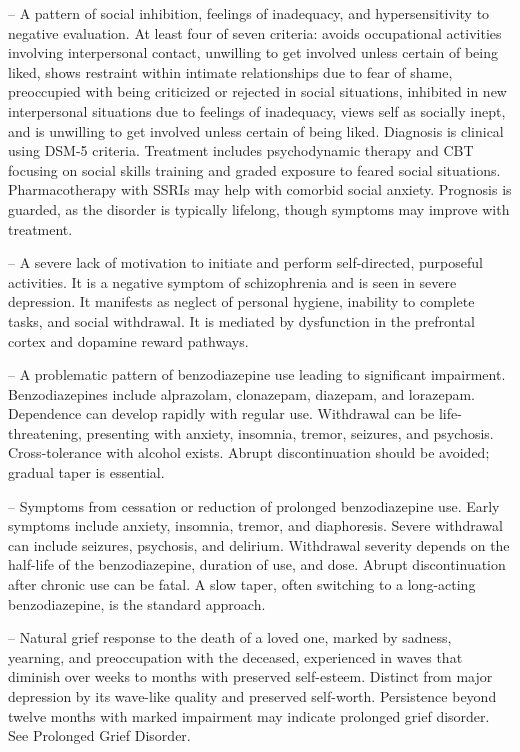 -- A pattern of social inhibition, feelings of inadequacy, and hypersensitivity to negative evaluation. At least four of seven criteria: avoids occupational activities involving interpersonal contact, unwilling to get involved unless certain of being liked, shows restraint within intimate relationships due to fear of shame, preoccupied with being criticized or rejected in social situations, inhibited in new interpersonal situations due to feelings of inadequacy, views self as socially inept, and is unwilling to get involved unless certain of being liked. Diagnosis is clinical using DSM-5 criteria. Treatment includes psychodynamic therapy and CBT focusing on social skills training and graded exposure to feared social situations. Pharmacotherapy with SSRIs may help with comorbid social anxiety. Prognosis is guarded, as the disorder is typically lifelong, though symptoms may improve with treatment.

-- A severe lack of motivation to initiate and perform self-directed, purposeful activities. It is a negative symptom of schizophrenia and is seen in severe depression. It manifests as neglect of personal hygiene, inability to complete tasks, and social withdrawal. It is mediated by dysfunction in the prefrontal cortex and dopamine reward pathways.

-- A problematic pattern of benzodiazepine use leading to significant impairment. Benzodiazepines include alprazolam, clonazepam, diazepam, and lorazepam. Dependence can develop rapidly with regular use. Withdrawal can be life-threatening, presenting with anxiety, insomnia, tremor, seizures, and psychosis. Cross-tolerance with alcohol exists. Abrupt discontinuation should be avoided; gradual taper is essential.

-- Symptoms from cessation or reduction of prolonged benzodiazepine use. Early symptoms include anxiety, insomnia, tremor, and diaphoresis. Severe withdrawal can include seizures, psychosis, and delirium. Withdrawal severity depends on the half-life of the benzodiazepine, duration of use, and dose. Abrupt discontinuation after chronic use can be fatal. A slow taper, often switching to a long-acting benzodiazepine, is the standard approach.

-- Natural grief response to the death of a loved one, marked by sadness, yearning, and preoccupation with the deceased, experienced in waves that diminish over weeks to months with preserved self-esteem. Distinct from major depression by its wave-like quality and preserved self-worth. Persistence beyond twelve months with marked impairment may indicate prolonged grief disorder. See Prolonged Grief Disorder.

